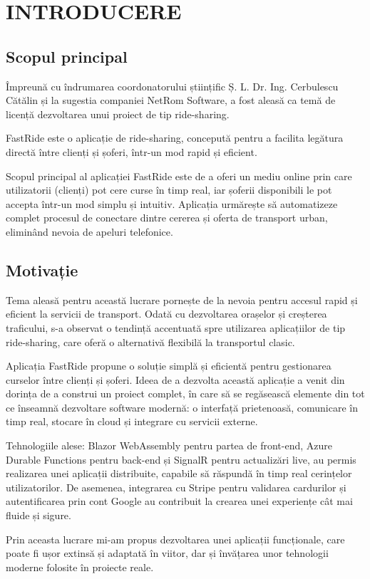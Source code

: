 \chapter{INTRODUCERE}
\section{Scopul principal}
Împreună cu îndrumarea coordonatorului științific Ș. L. Dr. Ing. Cerbulescu Cătălin și la sugestia companiei NetRom Software, a fost aleasă ca temă de licență dezvoltarea unui proiect de tip ride-sharing.

FastRide este o aplicație de ride-sharing, concepută pentru a facilita legătura directă între clienți și șoferi, într-un mod rapid și eficient.

Scopul principal al aplicației FastRide este de a oferi un mediu online prin care utilizatorii (clienți) pot cere curse în timp real, iar șoferii disponibili le pot accepta într-un mod simplu și intuitiv. Aplicația urmărește să automatizeze complet procesul de conectare dintre cererea și oferta de transport urban, eliminând nevoia de apeluri telefonice.

\section{Motivație}
Tema aleasă pentru această lucrare pornește de la nevoia pentru accesul rapid și eficient la servicii de transport. Odată cu dezvoltarea orașelor și creșterea traficului, s-a observat o tendință accentuată spre utilizarea aplicațiilor de tip ride-sharing, care oferă o alternativă flexibilă la transportul clasic.

Aplicația FastRide propune o soluție simplă și eficientă pentru gestionarea curselor între clienți și șoferi. Ideea de a dezvolta această aplicație a venit din dorința de a construi un proiect complet, în care să se regăsească elemente din tot ce înseamnă dezvoltare software modernă: o interfață prietenoasă, comunicare în timp real, stocare în cloud și integrare cu servicii externe.

Tehnologiile alese: Blazor WebAssembly pentru partea de front-end, Azure Durable Functions pentru back-end și SignalR pentru actualizări live, au permis realizarea unei aplicații distribuite, capabile să răspundă în timp real cerințelor utilizatorilor. De asemenea, integrarea cu Stripe pentru validarea cardurilor și autentificarea prin cont Google au contribuit la crearea unei experiențe cât mai fluide și sigure.

Prin aceasta lucrare mi-am propus dezvoltarea unei aplicații funcționale, care poate fi ușor extinsă și adaptată în viitor, dar și învățarea unor tehnologii moderne folosite în proiecte reale.